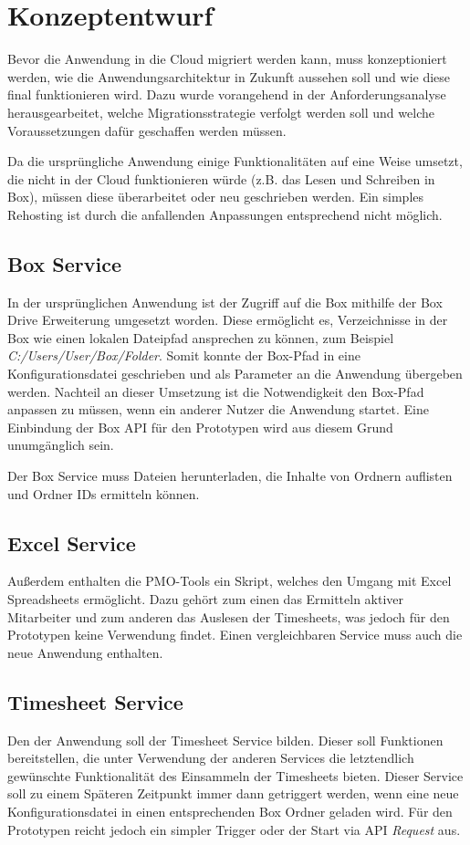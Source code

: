 \section{Konzeptentwurf}
Bevor die Anwendung in die Cloud migriert werden kann, muss konzeptioniert werden, wie die Anwendungsarchitektur in Zukunft aussehen soll und wie diese final funktionieren wird. Dazu wurde vorangehend in der Anforderungsanalyse herausgearbeitet, welche Migrationsstrategie verfolgt werden soll und welche Voraussetzungen dafür geschaffen werden müssen.

Da die ursprüngliche Anwendung einige Funktionalitäten auf eine Weise umsetzt, die nicht in der Cloud funktionieren würde (z.B. das Lesen und Schreiben in Box), müssen diese überarbeitet oder neu geschrieben werden. Ein simples Rehosting ist durch die anfallenden Anpassungen entsprechend nicht möglich.

\subsection{Box Service}
In der ursprünglichen Anwendung ist der Zugriff auf die Box mithilfe der Box Drive Erweiterung umgesetzt worden. Diese ermöglicht es, Verzeichnisse in der Box wie einen lokalen Dateipfad ansprechen zu können, zum Beispiel \textit{C:/Users/User/Box/Folder}. Somit konnte der Box-Pfad in eine Konfigurationsdatei geschrieben und als Parameter an die Anwendung übergeben werden. Nachteil an dieser Umsetzung ist die Notwendigkeit den Box-Pfad anpassen zu müssen, wenn ein anderer Nutzer die Anwendung startet. Eine Einbindung der Box API für den Prototypen wird aus diesem Grund unumgänglich sein.

Der Box Service muss Dateien herunterladen, die Inhalte von Ordnern auflisten und Ordner IDs ermitteln können.

\subsection{Excel Service}
Außerdem enthalten die PMO-Tools ein \grqq{} Skript, welches den Umgang mit Excel Spreadsheets ermöglicht. Dazu gehört zum einen das Ermitteln aktiver Mitarbeiter und zum anderen das Auslesen der Timesheets, was jedoch für den Prototypen keine Verwendung findet. Einen vergleichbaren Service muss auch die neue Anwendung enthalten.

\subsection{Timesheet Service}
Den \grqq{} der Anwendung soll der Timesheet Service bilden. Dieser soll Funktionen bereitstellen, die unter Verwendung der anderen Services die letztendlich gewünschte Funktionalität des Einsammeln der Timesheets bieten. Dieser Service soll zu einem Späteren Zeitpunkt immer dann getriggert werden, wenn eine neue Konfigurationsdatei in einen entsprechenden Box Ordner geladen wird. Für den Prototypen reicht jedoch ein simpler Trigger oder der Start via API \textit{Request} aus.

